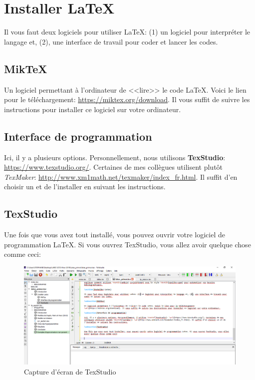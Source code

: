 \documentclass[12pt]{article}
\begin{document}
	\section{Installer LaTeX}
	
	Il vous faut deux logiciels pour utiliser LaTeX: (1) un logiciel pour interpréter le langage et, (2), une interface de travail pour coder et lancer les codes.
	
	\subsection{MikTeX}
	
	Un logiciel permettant à l'ordinateur de <<lire>> le code LaTeX. Voici le lien pour le téléchargement:
	\url{https://miktex.org/download}. Il vous suffit de suivre les instructions pour installer ce logiciel sur votre ordinateur.
	
	\subsection{Interface de programmation}
	
	Ici, il y a plusieurs options. Personnellement, nous utilisons \textbf{TexStudio}: \url{https://www.texstudio.org/}. Certaines de mes collègues utilisent plutôt \textit{TexMaker}: \url{http://www.xm1math.net/texmaker/index_fr.html}. Il suffit d'en choisir un et de l'installer en suivant les instructions.
	
	\subsection{TexStudio}
	
	Une fois que vous avez tout installé, vous pouvez ouvrir votre logiciel de programmation LaTeX. Si vous ouvrez TexStudio, vous allez avoir quelque chose comme ceci: \\
	
	\begin{figure}[H]
		\includegraphics[width=5.5in]{texstudio_screenshot.png}
		\caption{Capture d'écran de TexStudio}
	\end{figure}
	
\end{document}
